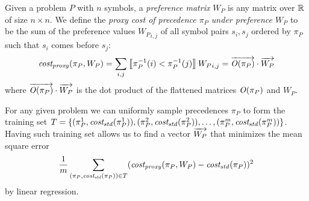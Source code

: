
Given a problem \(P\) with \(n\) symbols,
a \emph{preference matrix} \(W_P\) is any matrix over \(\operatorname{\mathbb{R}}\) of size \(n \times n\).
We define the \emph{proxy cost of precedence \(\pi_P\) under preference \(W_P\)}
to be the sum of the preference values \({W_P}_{i, j}\) of all symbol pairs \(s_i, s_j\)
ordered by \(\pi_P\) such that \(s_i\) comes before \(s_j\):
\begin{align*}
\operatorname{\mathit{cost_{proxy}}}(\pi_P, W_P) = \sum_{i, j} \left \llbracket \pi_P^{-1}(i) < \pi_P^{-1}(j) \right \rrbracket {W_P}_{i, j}
= \overrightarrow{\operatorname{\mathit{O}}(\pi_P)} \cdot \overrightarrow{W_P}
\end{align*}
where \(\overrightarrow{\operatorname{\mathit{O}}(\pi_P)} \cdot \overrightarrow{W_P}\) is the dot product
of the flattened matrices \(\operatorname{\mathit{O}}(\pi_P)\) and \(W_P\).

For any given problem we can uniformly sample precedences \(\pi_P\) to form the training set
\(T = \{(\pi_P^1, \operatorname{\mathit{cost_{std}}}(\pi_P^1)), (\pi_P^2, \operatorname{\mathit{cost_{std}}}(\pi_P^2)), \ldots, (\pi_P^m, \operatorname{\mathit{cost_{std}}}(\pi_P^m))\}\).
Having such training set allows us to find a vector \(\overrightarrow{W_P}\)
that minimizes the mean square error
\begin{align*}
\frac{1}{m} \sum_{(\pi_P, \operatorname{\mathit{cost_{std}}}(\pi_P)) \in T} (\operatorname{\mathit{cost_{proxy}}}(\pi_P, W_P) - \operatorname{\mathit{cost_{std}}}(\pi_P))^2
\end{align*}
by linear regression.

